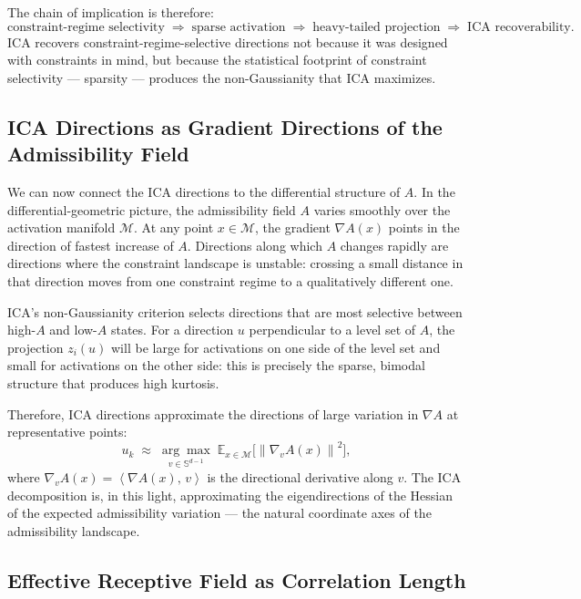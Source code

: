 \documentclass[12pt, a4paper]{article}
\theoremstyle{plain}
\theoremstyle{definition}
\theoremstyle{remark}
\newcommand{\Sph}{\mathbb{S}}
\newcommand{\cM}{\mathcal{M}}
\newcommand{\fA}{A}
\newcommand{\norm}[1]{\left\|#1\right\|}
\newcommand{\ip}[2]{\left\langle #1,\, #2 \right\rangle}
\newcommand{\Ra}{\Rightarrow}
\begin{document}
The chain of implication is therefore:
\begin{equation}
  \text{constraint-regime selectivity}
  \;\Ra\;
  \text{sparse activation}
  \;\Ra\;
  \text{heavy-tailed projection}
  \;\Ra\;
  \text{ICA recoverability}.
\end{equation}
ICA recovers constraint-regime-selective directions not because it was
designed with constraints in mind, but because the statistical footprint of
constraint selectivity --- sparsity --- produces the non-Gaussianity that ICA
maximizes.

\subsection{ICA Directions as Gradient Directions of the Admissibility Field}

We can now connect the ICA directions to the differential structure of $\fA$.
In the differential-geometric picture, the admissibility field $\fA$ varies
smoothly over the activation manifold $\cM$. At any point $x \in \cM$, the
gradient $\nabla \fA(x)$ points in the direction of fastest increase of $\fA$.
Directions along which $\fA$ changes rapidly are directions where the
constraint landscape is unstable: crossing a small distance in that direction
moves from one constraint regime to a qualitatively different one.

ICA's non-Gaussianity criterion selects directions that are most selective
between high-$\fA$ and low-$\fA$ states. For a direction $u$ perpendicular to
a level set of $\fA$, the projection $z_i(u)$ will be large for activations
on one side of the level set and small for activations on the other side: this
is precisely the sparse, bimodal structure that produces high kurtosis.

Therefore, ICA directions approximate the directions of large variation in
$\nabla \fA$ at representative points:
\begin{equation}
  u_k \;\approx\; \underset{v \in \Sph^{d-1}}{\arg\max}
  \; \mathbb{E}_{x \in \cM}\bigl[\norm{\nabla_v \fA(x)}^2\bigr],
\end{equation}
where $\nabla_v \fA(x) = \ip{\nabla \fA(x)}{v}$ is the directional derivative
along $v$. The ICA decomposition is, in this light, approximating the
eigendirections of the Hessian of the expected admissibility variation --- the
natural coordinate axes of the admissibility landscape.

\subsection{Effective Receptive Field as Correlation Length}
\end{document}
